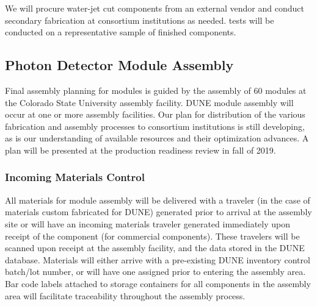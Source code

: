 We will procure water-jet cut components from an external vendor and conduct secondary fabrication at consortium institutions as needed.   tests will be conducted on a representative sample of finished components.

\label{sec:fdsp-pd-prod-pc}



\subsection{Photon Detector Module Assembly}

Final assembly planning for  modules is guided by the assembly of \num{60}   modules at the Colorado State University assembly facility. DUNE   module assembly will occur at one or more assembly facilities.  Our plan for distribution of the various fabrication and assembly processes to consortium institutions is still developing, as is our understanding of available resources and their optimization advances.  
A plan will be presented at the production readiness review in fall of 2019.

\subsubsection{Incoming Materials Control}

All materials for  module assembly will be delivered with a  traveler (in the case of materials custom fabricated for DUNE) generated prior to arrival at the assembly site or will have an incoming materials traveler generated immediately upon receipt of the component (for commercial components).  These travelers will be scanned upon receipt at the assembly facility, and the data stored in the DUNE  database.  Materials will either arrive with a pre-existing DUNE inventory control batch/lot number, or will have one assigned prior to entering the assembly area.  Bar code labels attached to storage containers for all components in the assembly area will facilitate traceability throughout the assembly process.

